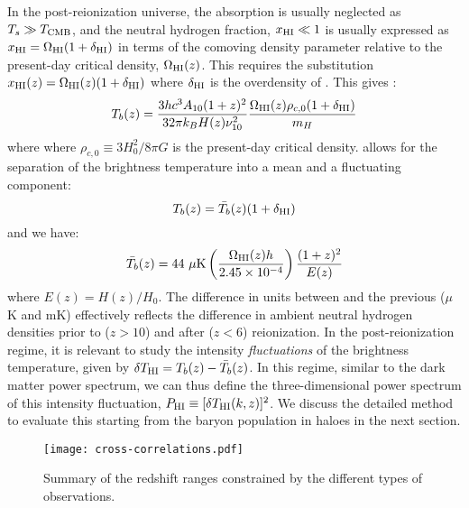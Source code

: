 In the post-reionization universe, the absorption is usually neglected as $T_s \gg T_{\rm CMB}$, and the neutral hydrogen fraction, $x_{\rm HI} \ll 1$ is usually  expressed as $x_{\rm HI} = \Omega_{\rm HI} (1+ \delta_{\rm HI})$ 
in terms of the comoving density parameter relative to the present-day critical density, $\Omega_{\rm HI} (z)$. This requires the substitution $x_{\rm HI}(z)  = \Omega_{\rm HI} (z) (1 + \delta_{\rm HI})$ where  $\delta_{\rm HI}$ is the overdensity of \HI. This gives \cite{bull2014, battye2012}:
 \begin{equation}
  T_b(z) = \frac{3 h c^3 A_{10} (1 + z)^2}{32 \pi k_B H(z) \nu_{10}^2}\frac{\Omega_{\rm HI} (z) \rho_{c,0} (1 + \delta_{\rm HI})}{m_H}
  \label{brtemp}
 \end{equation} 
 where where $\rho_{c,0} \equiv 3 H_0^2/8 \pi G$ is the present-day critical density.
 allows for the separation of the brightness temperature into a mean and a fluctuating component:
 \begin{equation}
   T_b(z) = \bar{T_b}(z) (1 + \delta_{\rm HI})
 \end{equation} 
and we have:
 \begin{equation}
  \bar{T_b}(z) = 44 \ \mu {\rm K} \left(\frac{\Omega_{\rm HI}(z) h}{2.45 \times 10^{-4}}\right) \frac{(1+z)^2}{E(z)}
  \label{tbar}
 \end{equation} 
 where $E(z) = H(z)/H_0$.
The difference in units between  and the previous  ($\mu$K and mK) effectively reflects the difference in ambient neutral hydrogen densities prior to ($z >10$) and after ($z < 6$) reionization. In the post-reionization regime, it is relevant to study 
 the intensity \textit{fluctuations} of the brightness temperature, given by $\delta T_{\rm HI} = T_b(z) -  \bar{T_b}(z)$.
 In this regime, similar to the dark matter power spectrum, we can thus define the three-dimensional power spectrum of this intensity fluctuation, $P_{\rm HI} \equiv [\delta T_{\rm HI}(k,z)]^2$. We discuss the detailed method to evaluate this starting from the baryon population in haloes in the next section.
 
 \begin{figure}
\vskip-0.2in
 \texttt{[image: cross-correlations.pdf]}
\caption{Summary of the redshift ranges constrained by the different types of observations.}
\label{fig:summary}
\end{figure}
 
 
